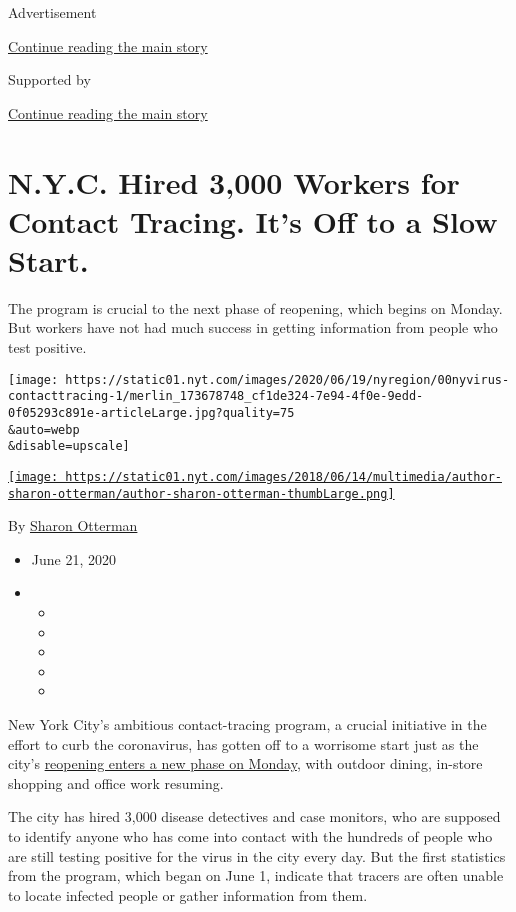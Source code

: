 Advertisement

\protect\hyperlink{after-top}{Continue reading the main story}

Supported by

\protect\hyperlink{after-sponsor}{Continue reading the main story}

\hypertarget{nyc-hired-3000-workers-for-contact-tracing-its-off-to-a-slow-start}{%
\section{N.Y.C. Hired 3,000 Workers for Contact Tracing. It's Off to a
Slow
Start.}\label{nyc-hired-3000-workers-for-contact-tracing-its-off-to-a-slow-start}}

The program is crucial to the next phase of reopening, which begins on
Monday. But workers have not had much success in getting information
from people who test positive.

\texttt{[image: https://static01.nyt.com/images/2020/06/19/nyregion/00nyvirus-contacttracing-1/merlin\_173678748\_cf1de324-7e94-4f0e-9edd-0f05293c891e-articleLarge.jpg?quality=75\\\&auto=webp\\\&disable=upscale]}

\href{https://www.nytimes.com/by/sharon-otterman}{\texttt{[image: https://static01.nyt.com/images/2018/06/14/multimedia/author-sharon-otterman/author-sharon-otterman-thumbLarge.png]}}

By \href{https://www.nytimes.com/by/sharon-otterman}{Sharon Otterman}

\begin{itemize}
\item
  June 21, 2020
\item
  \begin{itemize}
  \item
  \item
  \item
  \item
  \item
  \end{itemize}
\end{itemize}

New York City's ambitious contact-tracing program, a crucial initiative
in the effort to curb the coronavirus, has gotten off to a worrisome
start just as the city's
\href{https://www.nytimes.com/2020/06/18/nyregion/phase-2-reopening-nyc.html}{reopening
enters a new phase on Monday}, with outdoor dining, in-store shopping
and office work resuming.

The city has hired 3,000 disease detectives and case monitors, who are
supposed to identify anyone who has come into contact with the hundreds
of people who are still testing positive for the virus in the city every
day. But the first statistics from the program, which began on June 1,
indicate that tracers are often unable to locate infected people or
gather information from them.

